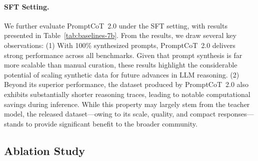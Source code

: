   \paragraph{SFT Setting.}
  We further evaluate PromptCoT~2.0 under the SFT setting, with results presented in Table~\ref{tab:baselines-7b}. From the results, we draw several key observations: (1) With 100\% synthesized prompts, PromptCoT~2.0 delivers strong performance across all benchmarks. Given that prompt synthesis is far more scalable than manual curation, these results highlight the considerable potential of scaling synthetic data for future advances in LLM reasoning. (2) Beyond its superior performance, the dataset produced by PromptCoT~2.0 also exhibits substantially shorter reasoning traces, leading to notable computational savings during inference. While this property may largely stem from the teacher model, the released dataset—owing to its scale, quality, and compact responses—stands to provide significant benefit to the broader community.
  
  
  
  
  
  
  
  \begin{table}[t]
  \centering
  \caption{Ablation results under the SFT setting using models with \textbf{7B} parameters. Bold numbers indicate the highest performance.}
  \label{tab:ablation}
  \end{table}
  
  
  \subsection{Ablation Study}
  

